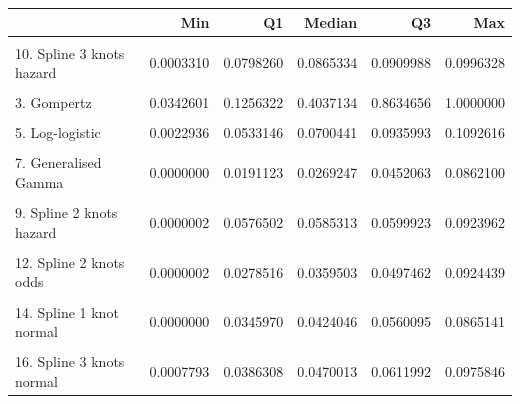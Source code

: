 \documentclass[]{article}
\begin{document}
\begin{tabular}{lrrrrr}
\toprule
  & Min & Q1 & Median & Q3 & Max\\
\midrule
\cellcolor{gray!6}{1. Exponential} & \cellcolor{gray!6}{0.0585969} & \cellcolor{gray!6}{0.0585969} & \cellcolor{gray!6}{0.0585969} & \cellcolor{gray!6}{0.0585969} & \cellcolor{gray!6}{0.0585969}\\
10. Spline 3 knots hazard & 0.0003310 & 0.0798260 & 0.0865334 & 0.0909988 & 0.0996328\\
\cellcolor{gray!6}{2. Weibull} & \cellcolor{gray!6}{0.0039603} & \cellcolor{gray!6}{0.1641779} & \cellcolor{gray!6}{0.2507544} & \cellcolor{gray!6}{0.3170901} & \cellcolor{gray!6}{0.3714738}\\
3. Gompertz & 0.0342601 & 0.1256322 & 0.4037134 & 0.8634656 & 1.0000000\\
\cellcolor{gray!6}{4. Log-normal} & \cellcolor{gray!6}{0.0000121} & \cellcolor{gray!6}{0.0563972} & \cellcolor{gray!6}{0.0670524} & \cellcolor{gray!6}{0.0819079} & \cellcolor{gray!6}{0.0936091}\\
5. Log-logistic & 0.0022936 & 0.0533146 & 0.0700441 & 0.0935993 & 0.1092616\\
\cellcolor{gray!6}{6. Gamma} & \cellcolor{gray!6}{0.0014181} & \cellcolor{gray!6}{0.1390361} & \cellcolor{gray!6}{0.1644882} & \cellcolor{gray!6}{0.1750195} & \cellcolor{gray!6}{0.1807519}\\
7. Generalised Gamma & 0.0000000 & 0.0191123 & 0.0269247 & 0.0452063 & 0.0862100\\
\cellcolor{gray!6}{8. Spline 1 knot hazard} & \cellcolor{gray!6}{0.0000002} & \cellcolor{gray!6}{0.0592140} & \cellcolor{gray!6}{0.0598953} & \cellcolor{gray!6}{0.0610195} & \cellcolor{gray!6}{0.0916043}\\
9. Spline 2 knots hazard & 0.0000002 & 0.0576502 & 0.0585313 & 0.0599923 & 0.0923962\\
\cellcolor{gray!6}{11. Spline 1 knot odds} & \cellcolor{gray!6}{0.0000002} & \cellcolor{gray!6}{0.0281269} & \cellcolor{gray!6}{0.0363823} & \cellcolor{gray!6}{0.0502992} & \cellcolor{gray!6}{0.0917044}\\
12. Spline 2 knots odds & 0.0000002 & 0.0278516 & 0.0359503 & 0.0497462 & 0.0924439\\
\cellcolor{gray!6}{13. Spline 3 knots odds} & \cellcolor{gray!6}{0.0003253} & \cellcolor{gray!6}{0.0358147} & \cellcolor{gray!6}{0.0466608} & \cellcolor{gray!6}{0.0638606} & \cellcolor{gray!6}{0.0999099}\\
14. Spline 1 knot normal & 0.0000000 & 0.0345970 & 0.0424046 & 0.0560095 & 0.0865141\\
\cellcolor{gray!6}{15. Spline 2 knots normal} & \cellcolor{gray!6}{0.0000006} & \cellcolor{gray!6}{0.0281480} & \cellcolor{gray!6}{0.0348987} & \cellcolor{gray!6}{0.0473455} & \cellcolor{gray!6}{0.0953359}\\
16. Spline 3 knots normal & 0.0007793 & 0.0386308 & 0.0470013 & 0.0611992 & 0.0975846\\
\bottomrule
\end{tabular}
\end{document}
